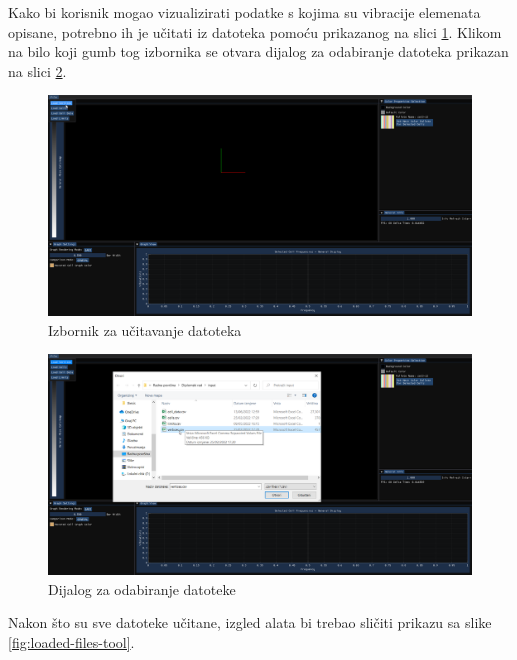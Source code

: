 \documentclass[times, utf8, diplomski]{fer}
\begin{document}
Kako bi korisnik mogao vizualizirati podatke s kojima su vibracije elemenata opisane, potrebno ih je učitati iz datoteka pomoću prikazanog na slici \ref{fig:file-menu}. Klikom na bilo koji gumb tog izbornika se otvara dijalog za odabiranje datoteka prikazan na slici \ref{fig:file-dialog}.

\begin{figure} [H]
	\centering
    \includegraphics[width=\textwidth]{demonstration/load_file_menu.png}
    \caption{Izbornik za učitavanje datoteka}
    \label{fig:file-menu}
\end{figure}

\begin{figure} [H]
	\centering
    \includegraphics[width=\textwidth]{demonstration/file_select_dialog.png}
    \caption{Dijalog za odabiranje datoteke}
    \label{fig:file-dialog}
\end{figure}

Nakon što su sve datoteke učitane, izgled alata bi trebao sličiti prikazu sa slike \ref{fig:loaded-files-tool}.
\end{document}
